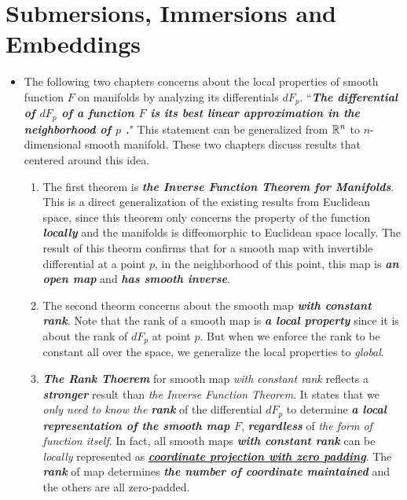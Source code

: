 \documentclass[11pt]{article}
\begin{document}
\section{Submersions, Immersions and Embeddings}
\begin{itemize}
\item \begin{remark}
The following two chapters concerns about the local properties of smooth function $F$ on manifolds by analyzing its differentials $dF_{p}$. ``\emph{\textbf{The differential of $dF_{p}$ of a function $F$ is its best linear approximation in the neighborhood of $p$ .}}" This statement can be generalized from ${\mathbb R}^{n}$ to $n$-dimensional smooth manifold. These two chapters discuss results that centered around this idea.  
\begin{enumerate}
\item The first theorem is \emph{\textbf{the Inverse Function Theorem for Manifolds}}. This is a direct generalization of the existing results from Euclidean space, since this theorem only concerns the property of the function \emph{\textbf{locally}} and the manifolds is diffeomorphic to Euclidean space locally. The result of this theorm confirms that for a smooth map with invertible differential at a point $p$, in the neighborhood of this point, this map is \emph{\textbf{an open map}} and \emph{\textbf{has smooth inverse}}. 

\item The second theorm concerns about the smooth map \emph{\textbf{with constant rank}}.  Note that the rank of a smooth map is \emph{\textbf{a local property}} since it is about the rank of $dF_p$ at point $p$. But when we enforce the rank to be constant all over the space, we generalize the local properties to \emph{global}. 

\item \emph{\textbf{The Rank Thoerem}} for smooth map \emph{with constant rank} reflects a \emph{\textbf{stronger}} result than \emph{the Inverse Function Theorem}. It states that we \emph{only need to know the \textbf{rank}} of the differential $dF_p$ to determine \emph{\textbf{a local representation of the smooth map $F$}}, \emph{\textbf{regardless}} of \emph{the form of function itself}. In fact, all smooth maps \emph{\textbf{with constant rank}} can be \emph{locally} represented as \underline{\emph{\textbf{coordinate projection with zero padding}}}.  The \emph{\textbf{rank}} of map determines \emph{\textbf{the number of coordinate maintained}} and the others are all zero-padded.


\end{enumerate}
\end{remark}
\end{itemize}
\end{document}
